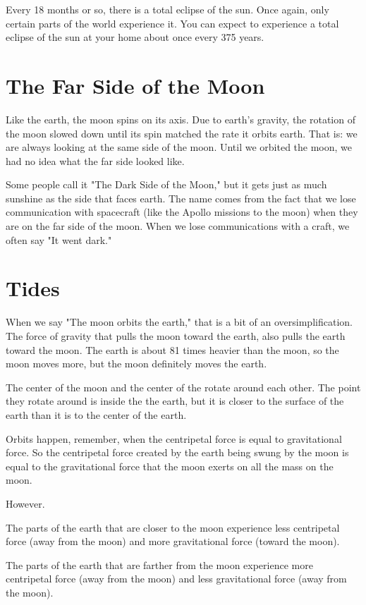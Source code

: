 Every 18 months or so,  there is a total eclipse of the sun.  Once again,  only certain parts of the world experience it.   You can expect to experience a total eclipse of the sun at your home about once every 375 years.
 
\section{The Far Side of the Moon}

Like the earth,  the moon spins on its axis.  Due to earth's gravity,  the rotation of the moon slowed down until its spin matched the rate it orbits earth.  That is: we are always looking at the same side of the moon.  Until we orbited the moon,  we had no idea what the far side looked like.

Some people call it "The Dark Side of the Moon," but it gets just as much sunshine as the side that faces earth.  The name comes from the fact that we lose communication with spacecraft (like the Apollo missions to the moon) when they are on the far side of the moon.  When we lose communications with a craft, 
we often say "It went dark."

\section{Tides}

When we say "The moon orbits the earth,"  that is a bit of an oversimplification.  The force of gravity that pulls the moon toward the earth,  also pulls the earth toward the moon.   The earth is about 81 times heavier
than the moon,  so the moon moves more, but the moon definitely moves the earth.

The center of the moon and the center of the rotate around each other.  The point they rotate around is inside the the earth,  but it is closer to the surface of the earth than it is to the center of the earth.

Orbits happen, remember, when the centripetal force is equal to gravitational force.  So the centripetal force created by the earth being swung by the moon is equal to the gravitational force that the moon exerts on all the mass on the moon.

However.  

The parts of the earth that are closer to the moon experience less centripetal force (away from the moon) and more gravitational force (toward the moon).

The parts of the earth that are farther from the moon experience more centripetal force (away from the moon) and less gravitational force (away from the moon).   


